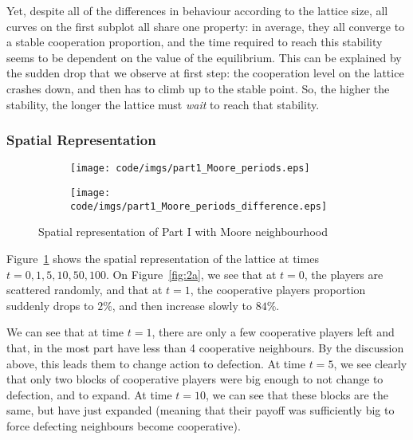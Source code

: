 \documentclass{article}
\begin{document}
Yet, despite all of the differences in behaviour according to the lattice size, all curves on the first
subplot all share one property: in average, they all converge to a stable cooperation proportion, and
the time required to reach this stability seems to be dependent on the value of the equilibrium.
This can be explained by the sudden drop that we observe at first step: the cooperation level on the
lattice crashes down, and then has to climb up to the stable point. So, the higher the stability, the
longer the lattice must \textit{wait} to reach that stability.

\subsubsection{Spatial Representation}

\begin{figure}[!b]
	\begin{subfigure}{\textwidth}
		\hspace{-2.5cm}
		\vspace{-.5cm}
		\texttt{[image: code/imgs/part1\_Moore\_periods.eps]}
	\end{subfigure}
	\begin{subfigure}{\textwidth}
		\centering
		\texttt{[image: code/imgs/part1\_Moore\_periods\_difference.eps]}
	\end{subfigure}
	\caption{Spatial representation of Part I with Moore neighbourhood\label{fig:Spatial Representation Part I Moore}}
\end{figure}

Figure~\ref{fig:Spatial Representation Part I Moore} shows the spatial representation of the lattice at
times $t = 0, 1, 5, 10, 50, 100$. On Figure~\ref{fig:2a}, we see that at $t=0$, the players are scattered
randomly, and that at $t=1$, the cooperative players proportion suddenly drops to $2\%$, and then
increase slowly to $84\%$.

We can see that at time $t=1$, there are only a few cooperative players left and that, in the most
part have less than 4 cooperative neighbours. By the discussion above, this leads them to change action
to defection. At time $t=5$, we see clearly that only two blocks of cooperative players were big enough
to not change to defection, and to expand. At time $t=10$, we can see that these blocks are the same,
but have just expanded (meaning that their payoff was sufficiently big to force defecting neighbours
become cooperative).
\end{document}
